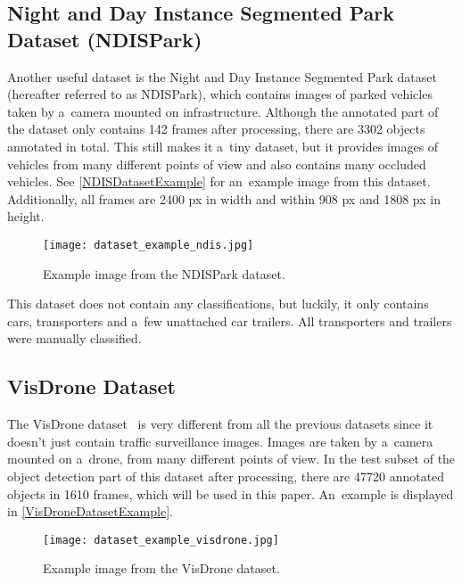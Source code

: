 \subsection{Night and Day Instance Segmented Park Dataset (NDISPark)}

Another useful dataset is the Night and Day Instance Segmented Park
dataset~\cite{Luca2022} (hereafter referred to as NDISPark), which contains
images of parked vehicles taken by a~camera mounted on infrastructure. Although
the annotated part of the dataset only contains \num{142} frames after
processing, there are \num{3302} objects annotated in total. This still makes it
a~tiny dataset, but it provides images of vehicles from many different points of
view and also contains many occluded vehicles. See \autoref{NDISDatasetExample}
for an~example image from this dataset. Additionally, all frames are \num{2400}
px in width and within \num{908} px and \num{1808} px in height.

\begin{figure}[t]
    \centering
    \texttt{[image: dataset\_example\_ndis.jpg]}
    \captionsetup{width=0.7\textwidth}
    \caption{Example image from the NDISPark dataset.}
    \label{NDISDatasetExample}
\end{figure}

This dataset does not contain any classifications, but luckily, it only contains
cars, transporters and a~few unattached car trailers. All transporters and
trailers were manually classified.


\subsection{VisDrone Dataset}

The VisDrone dataset~\cite{Zhu2022} is very different from all the previous
datasets since it doesn't just contain traffic surveillance images. Images are
taken by a~camera mounted on a~drone, from many different points of view. In the
test subset of the object detection part of this dataset after processing, there
are \num{47720} annotated objects in \num{1610} frames, which will be used in
this paper. An~example is displayed in \autoref{VisDroneDatasetExample}.

\begin{figure}[t]
    \centering
    \texttt{[image: dataset\_example\_visdrone.jpg]}
    \caption{Example image from the VisDrone dataset.}
    \label{VisDroneDatasetExample}
\end{figure}

